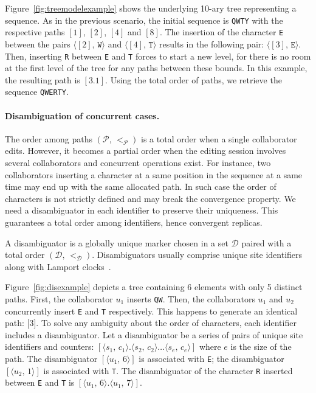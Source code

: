 Figure~\ref{fig:treemodelexample} shows the underlying 10-ary tree representing
a sequence. As in the previous scenario, the initial sequence is \texttt{QWTY}
with the respective paths $[1]$, $[2]$, $[4]$ and $[8]$. The insertion of the
character \texttt{E} between the pairs $\langle [2],\, \texttt{W}\rangle$ and
$\langle [4],\, \texttt{T}\rangle$ results in the following pair:
$\langle [3],\, \texttt{E} \rangle$. Then, inserting \texttt{R} between
\texttt{E} and \texttt{T} forces to start a new level, for there is no room at
the first level of the tree for any paths between these bounds. In this example,
the resulting path is $[3.1]$. Using the total order of paths, we retrieve the
sequence \texttt{QWERTY}.


\paragraph{Disambiguation of concurrent cases.}

The order among paths $(\mathcal{P},\,<_\mathcal{P})$ is a total order when a
single collaborator edits. However, it becomes a partial order when the editing
session involves several collaborators and concurrent operations exist. For
instance, two collaborators inserting a character at a same position in the
sequence at a same time may end up with the same allocated path. In such case
the order of characters is not strictly defined and may break the convergence
property. We need a disambiguator in each identifier to preserve their
uniqueness. This guarantees a total order among identifiers, hence convergent
replicas.

\begin{definition}[Disambiguator]
  A disambiguator is a globally unique marker chosen in a set $\mathcal{D}$
  paired with a total order $(\mathcal{D},\, <_\mathcal{D})$. Disambiguators
  usually comprise unique site identifiers along with Lamport
  clocks~\cite{lamport1978time}.
\end{definition}

Figure~\ref{fig:disexample} depicts a tree containing 6 elements with only 5
distinct paths. First, the collaborator $u_1$ inserts \texttt{QW}.  Then, the
collaborators $u_1$ and $u_2$ concurrently insert \texttt{E} and \texttt{T}
respectively. This happens to generate an identical path: [$3$]. To solve any
ambiguity about the order of characters, each identifier includes a
disambiguator.  Let a disambiguator be a series of pairs of unique site
identifiers and counters:
$[\langle s_1,\, c_1 \rangle.\langle s_2,\, c_2 \rangle \ldots \langle s_e,\,
c_e \rangle]$
where $e$ is the size of the path.  The disambiguator
$[\langle u_1,\, 6\rangle]$ is associated with \texttt{E}; the disambiguator
$[\langle u_2,\, 1\rangle]$ is associated with \texttt{T}. The disambiguator of
the character \texttt{R} inserted between \texttt{E} and \texttt{T} is
$[\langle u_1,\, 6\rangle.\langle u_1,\, 7\rangle]$.


